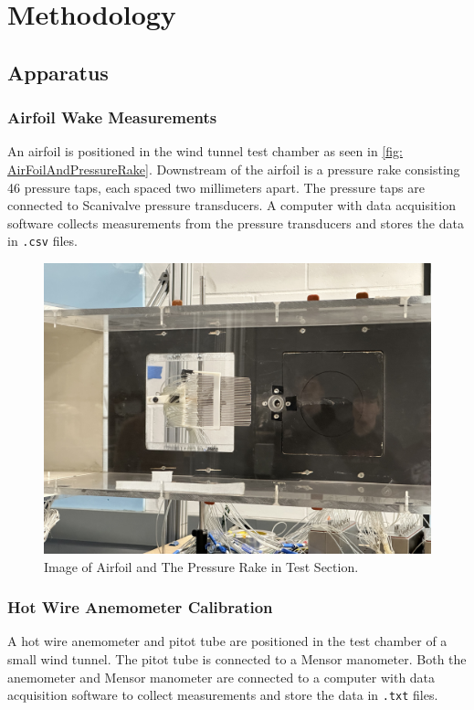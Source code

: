 \chapter{Methodology}
\label{cp:methodology}

\section{Apparatus}\label{sec:apparatus}
\subsection{Airfoil Wake Measurements}
An airfoil is positioned in the wind tunnel test chamber as seen in \autoref{fig: AirFoilAndPressureRake}. Downstream of the airfoil is a pressure rake consisting \num{46} pressure taps, each spaced two millimeters apart. The pressure taps are connected to Scanivalve pressure transducers. A computer with data acquisition software collects measurements from the pressure transducers and stores the data in \verb|.csv| files.

\begin{figure}[htpb]
    \centering
    \includegraphics[width=0.75\linewidth]{Figures/IMG_3196.jpeg}
    \caption[Image of Airfoil and The Pressure Rake in Test Section.]{Image of Airfoil and The Pressure Rake in Test Section.}
    \label{fig: AirFoilAndPressureRake}
\end{figure}

\subsection{Hot Wire Anemometer Calibration}
A hot wire anemometer and pitot tube are positioned in the test chamber of a small wind tunnel. The pitot tube is connected to a Mensor manometer. Both the anemometer and Mensor manometer are connected to a computer with data acquisition software to collect measurements and store the data in \verb|.txt| files. 

